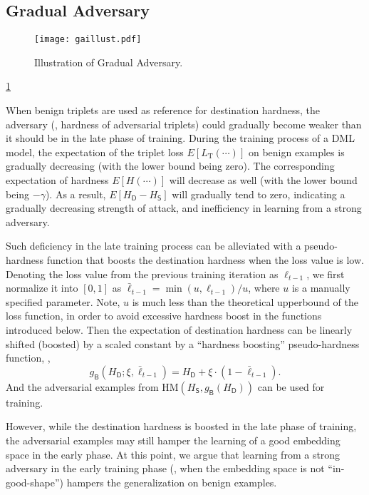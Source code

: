 \documentclass[10pt,twocolumn,letterpaper]{article}
\begin{document}
\subsection{Gradual Adversary}
\label{sec:32}

\begin{figure}
	\texttt{[image: gaillust.pdf]}
	\caption{Illustration of Gradual Adversary.}
	\label{fig:ga}
\end{figure}

\cref{fig:ga}


When benign triplets are used as reference for destination hardness, the
adversary (\ie, hardness of adversarial triplets) could gradually become weaker
than it should be in the late phase of training.
%
During the training process of a DML model, the expectation of the triplet loss
$E[L_\text{T}(\cdots)]$ on benign examples is gradually decreasing
(with the lower bound being zero).
%
The corresponding expectation of hardness $E[H(\cdots)]$ will
decrease as well (with the lower bound being $-\gamma$).
%
As a result, $E[H_\mathsf{D}-H_\mathsf{S}]$ will gradually tend to zero,
indicating a gradually decreasing strength of attack, and inefficiency in
learning from a strong adversary.


Such deficiency in the late training process can be alleviated with a
pseudo-hardness function that boosts the destination hardness when the loss
value is low.
%
Denoting the loss value from the previous training iteration as $\ell_{t-1}$,
we first normalize it into $[0,1]$ as $\bar{\ell}_{t-1}=\min(u,\ell_{t-1})/u$,
where $u$ is a manually specified parameter.
%
Note, $u$ is much less than the theoretical upperbound of the loss function,
in order to avoid excessive hardness boost in the functions introduced below.
%
Then the expectation of destination hardness can be linearly shifted (boosted)
by a scaled constant by a ``hardness boosting'' pseudo-hardness
function, \ie,
%
\begin{equation}
	g_\mathsf{B}(H_\mathsf{D};\xi,\bar{\ell}_{t-1}) =
	H_\mathsf{D} + \xi \cdot (1-\bar{\ell}_{t-1}).
\end{equation}
%
And the adversarial examples from $\text{HM}(H_\mathsf{S},g_\mathsf{B}(H_\mathsf{D}))$
can be used for training.


However, while the destination hardness is boosted in the late phase of
training, the adversarial examples may still hamper the learning of a good
embedding space in the early phase.
%
At this point, we argue that learning from a strong adversary in the early
training phase (\ie, when the embedding space is not ``in-good-shape'') hampers the
generalization on benign examples.
\end{document}

